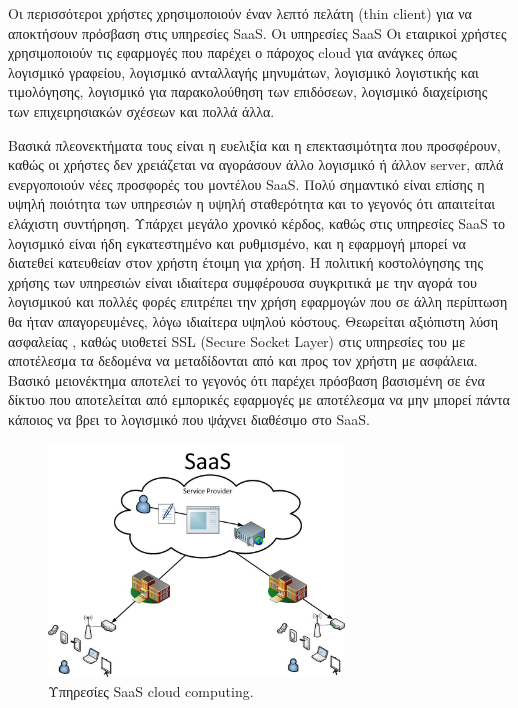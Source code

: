 	Οι περισσότεροι χρήστες χρησιμοποιούν έναν λεπτό πελάτη (thin client) για να αποκτήσουν πρόσβαση στις υπηρεσίες SaaS. Οι υπηρεσίες SaaS Οι εταιρικοί χρήστες χρησιμοποιούν τις εφαρμογές που παρέχει ο πάροχος cloud για ανάγκες όπως λογισμικό γραφείου, λογισμικό ανταλλαγής μηνυμάτων,  λογισμικό λογιστικής και τιμολόγησης, λογισμικό για παρακολούθηση των επιδόσεων, λογισμικό διαχείρισης των επιχειρησιακών σχέσεων και πολλά άλλα. 
	
	Βασικά πλεονεκτήματα τους είναι η ευελιξία και η επεκτασιμότητα που προσφέρουν, καθώς οι χρήστες δεν χρειάζεται να αγοράσουν άλλο λογισμικό ή άλλον server, απλά ενεργοποιούν νέες προσφορές του μοντέλου SaaS. Πολύ σημαντικό είναι επίσης η υψηλή ποιότητα των υπηρεσιών η υψηλή σταθερότητα και το γεγονός ότι απαιτείται ελάχιστη συντήρηση. Υπάρχει μεγάλο χρονικό κέρδος, καθώς στις υπηρεσίες SaaS το λογισμικό είναι ήδη εγκατεστημένο και ρυθμισμένο, και η εφαρμογή μπορεί να διατεθεί κατευθείαν στον χρήστη έτοιμη για χρήση. Η πολιτική κοστολόγησης της χρήσης των υπηρεσιών είναι ιδιαίτερα συμφέρουσα συγκριτικά με την αγορά του λογισμικού και πολλές φορές επιτρέπει την χρήση εφαρμογών που σε άλλη περίπτωση θα ήταν απαγορευμένες, λόγω ιδιαίτερα υψηλού κόστους. Θεωρείται αξιόπιστη λύση ασφαλείας , καθώς υιοθετεί SSL (Secure Socket Layer) στις υπηρεσίες του με αποτέλεσμα τα δεδομένα να μεταδίδονται από και προς τον χρήστη με ασφάλεια. Βασικό μειονέκτημα αποτελεί το γεγονός ότι παρέχει πρόσβαση βασισμένη σε ένα δίκτυο που αποτελείται από εμπορικές εφαρμογές με αποτέλεσμα να μην μπορεί πάντα κάποιος να βρει το λογισμικό που ψάχνει διαθέσιμο στο SaaS. 
	
		\begin{figure}[h]
	    \centering
	    \includegraphics[width=0.7\textwidth]{SaaS.jpg}
	    \caption{Υπηρεσίες SaaS cloud computing.}
	    \label{fig:saas}
	\end{figure}
	
